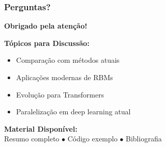 \documentclass[aspectratio=169]{beamer}
\begin{document}
\begin{frame}
\frametitle{Perguntas?}
\begin{center}
{\Large \textcolor{azulescuro}{\textbf{Obrigado pela atenção!}}}

\vspace{1cm}

\textbf{Tópicos para Discussão:}
\begin{itemize}
    \item Comparação com métodos atuais
    \item Aplicações modernas de RBMs
    \item Evolução para Transformers
    \item Paralelização em deep learning atual
\end{itemize}

\vspace{0.5cm}

\textbf{Material Disponível:}\\
Resumo completo $\bullet$ Código exemplo $\bullet$ Bibliografia
\end{center}
\end{frame}
\end{document}
